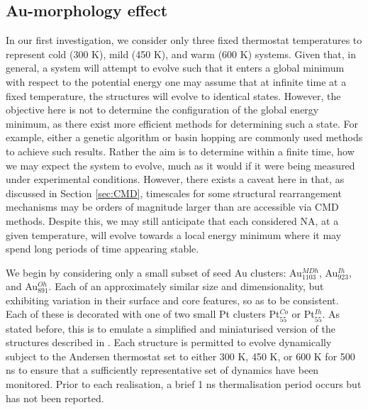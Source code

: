 \subsection{Au-morphology effect}

In our first investigation, we consider only three fixed thermostat temperatures to represent cold (300 K), mild (450 K), and warm (600 K) systems. Given that, in general, a system will attempt to evolve such that it enters a global minimum with respect to the potential energy one may assume that at infinite time at a fixed temperature, the structures will evolve to identical states. However, the objective here is not to determine the configuration of the global energy minimum, as there exist more efficient methods for determining such a state. For example, either a genetic algorithm \cite{YANG2018371,Fra_Ricardo_Review,Oakley2013-zl} or basin hopping \cite{Fra_Review,B204069G,doi:10.1021/jp207246m} are commonly used methods to achieve such results. Rather the aim is to determine within a finite time, how we may expect the system to evolve, much as it would if it were being measured under experimental conditions. However, there exists a caveat here in that, as discussed in Section \ref{sec:CMD}, timescales for some structural rearrangement mechanisms may be orders of magnitude larger than are accessible via CMD methods. Despite this, we may still anticipate that each considered NA, at a given temperature, will evolve towards a local energy minimum where it may spend long periods of time appearing stable. 

We begin by considering only a small subset of seed Au clusters: Au$_{1103}^{MDh}$, Au$_{923}^{Ih}$, and Au$_{891}^{Oh}$. Each of an approximately similar size and dimensionality, but exhibiting variation in their surface and core features, so as to be consistent. Each of these is decorated with one of two small Pt clusters Pt$_{55}^{Co}$ or Pt$_{55}^{Ih}$. As stated before, this is to emulate a simplified and miniaturised version of the structures described in \cite{Jorge2019}. Each structure is permitted to evolve dynamically subject to the Andersen thermostat set to either 300 K, 450 K, or 600 K for 500 ns to ensure that a sufficiently representative set of dynamics have been monitored. Prior to each realisation, a brief 1 ns thermalisation period occurs but has not been reported. 

